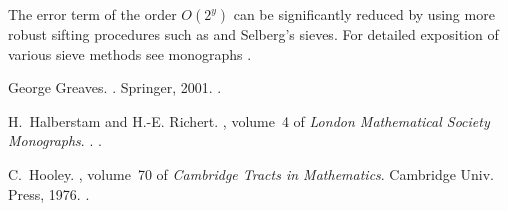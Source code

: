 \documentclass[12pt]{article}
\begin{document}
The error term of the order $O(2^y)$ can be significantly reduced
by using more robust sifting procedures such as  and Selberg's sieves. For detailed exposition
of various sieve methods see monographs
\cite{cite:greaves_sieves,cite:halberstam_richert_sieves,cite:hooley_appsievemethods}.

\begin{thebibliography}{1}

George Greaves.
.
\newblock Springer, 2001.
\newblock {}.

H.~Halberstam and H.-E. Richert.
, volume~4 of {\em London Mathematical Society
  Monographs}.
.
\newblock {}.

C.~Hooley.
,
  volume~70 of {\em Cambridge Tracts in Mathematics}.
\newblock Cambridge Univ. Press, 1976.
\newblock {}.

\end{thebibliography}
\end{document}
